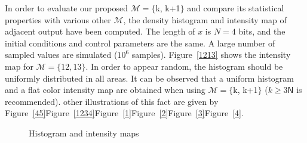 In order to evaluate our proposed $\mathcal{M}=\{$k, k+1$\}$ and compare its statistical properties with various other $\mathcal{M}$, the density histogram and intensity map of adjacent output have been computed. The length of $x$ is $N = 4$ bits, and the initial conditions and control
parameters are the same. A large number of
sampled values are simulated ($10^6$ samples). 
Figure~\ref{1213} shows the intensity map for $\mathcal{M}=\{12,13\}$.
In order to appear random, the histogram should be uniformly distributed in all areas. 
It can be observed that a uniform histogram and a flat color intensity map are obtained when using $\mathcal{M}=\{$k, k+1$\}$ ($k\geqslant 3\mathsf{N}$ is recommended). 
other illustrations of this fact are given by Figure~\ref{45}Figure~\ref{1234}Figure~\ref{1}Figure~\ref{2}Figure~\ref{3}Figure~\ref{4}. 

\begin{figure}
\centering
{} \hspace{0.4cm}
 \hspace{0.4cm}
 \hspace{0.4cm}
 \hspace{0.4cm}
 \hspace{0.4cm}
 \hspace{0.4cm}
 \hspace{0.4cm}
\caption{Histogram and intensity maps}
\label{Histogram}
\end{figure}


